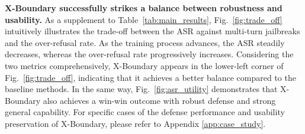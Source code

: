 \textbf{X-Boundary successfully strikes a balance between robustness and usability.}
%
As a supplement to Table~\ref{tab:main_results}, Fig.~\ref{fig:trade_off} intuitively illustrates the trade-off between the ASR against multi-turn jailbreaks and the over-refusal rate.
%
As the training process advances, the ASR steadily decreases, whereas the over-refusal rate progressively increases.
%
Considering the two metrics comprehensively, X-Boundary appears in the lower-left corner of Fig.~\ref{fig:trade_off}, indicating that it achieves a better balance compared to the baseline methods.
%
In the same way, Fig.~\ref{fig:asr_utility} demonstrates that X-Boundary also achieves a win-win outcome with robust defense and strong general capability.
%
For specific cases of the defense performance and usability preservation of X-Boundary, please refer to Appendix \ref{app:case_study}.


